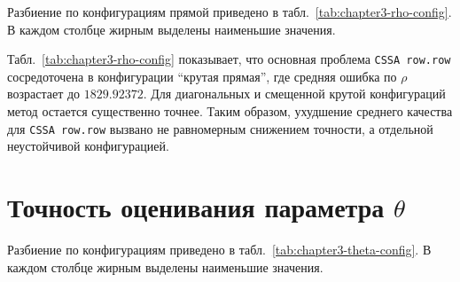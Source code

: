 Разбиение по конфигурациям прямой приведено в
табл.~\ref{tab:chapter3-rho-config}. В каждом столбце жирным выделены наименьшие
значения.

\begin{table}[H]
	\centering
	\caption{Средние ошибки оценивания параметра $\rho$ по конфигурациям прямой}
	\label{tab:chapter3-rho-config}
\end{table}

Табл.~\ref{tab:chapter3-rho-config} показывает, что основная проблема
\texttt{CSSA row.row} сосредоточена в конфигурации ``крутая прямая'', где
средняя ошибка по $\rho$ возрастает до $1829.92372$. Для диагональных и
смещенной крутой конфигураций метод остается существенно точнее. Таким
образом, ухудшение среднего качества для \texttt{CSSA row.row} вызвано не
равномерным снижением точности, а отдельной неустойчивой конфигурацией.

\section{Точность оценивания параметра $\theta$}

Разбиение по конфигурациям приведено в
табл.~\ref{tab:chapter3-theta-config}. В каждом столбце жирным выделены
наименьшие значения.

